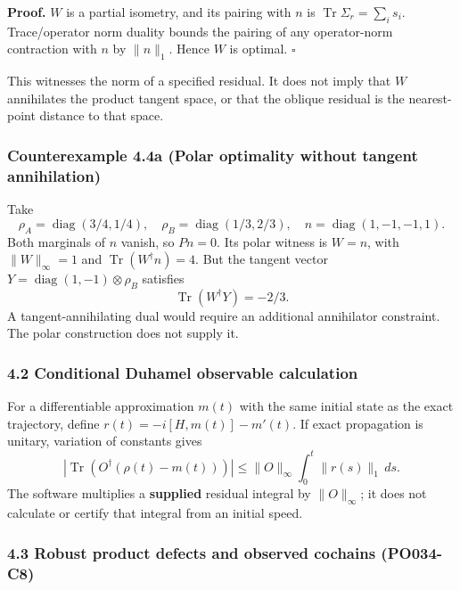 \documentclass[
  11pt,
]{article}
\begin{document}
\textbf{Proof.} \(W\) is a partial isometry, and its pairing with \(n\) is
\(\operatorname{Tr}\Sigma_r=\sum_i s_i\). Trace/operator norm duality
bounds the pairing of any operator-norm contraction with \(n\) by
\(\|n\|_1\). Hence \(W\) is optimal. \(\square\)

This witnesses the norm of a specified residual. It does not imply that
\(W\) annihilates the product tangent space, or that the oblique residual
is the nearest-point distance to that space.

\subsubsection{Counterexample 4.4a (Polar optimality without tangent annihilation)}\label{counterexample-4.4a-polar-optimality-without-tangent-annihilation}

Take
\[
\rho_A=\operatorname{diag}(3/4,1/4),\quad
\rho_B=\operatorname{diag}(1/3,2/3),\quad
n=\operatorname{diag}(1,-1,-1,1).
\]
Both marginals of \(n\) vanish, so \(Pn=0\).
Its polar witness is \(W=n\), with \(\|W\|_\infty=1\) and
\(\operatorname{Tr}(W^\dagger n)=4\).
But the tangent vector
\(Y=\operatorname{diag}(1,-1)\otimes\rho_B\) satisfies
\[
\operatorname{Tr}(W^\dagger Y)=-2/3.
\]
A tangent-annihilating dual would require an additional annihilator
constraint. The polar construction does not supply it.

\subsubsection{4.2 Conditional Duhamel observable calculation}\label{conditional-duhamel-observable-calculation}

For a differentiable approximation \(m(t)\) with the same initial state as
the exact trajectory, define \(r(t)=-i[H,m(t)]-m'(t)\).
If exact propagation is unitary, variation of constants gives
\[
|\operatorname{Tr}(O^\dagger(\rho(t)-m(t)))|
 \le\|O\|_\infty\int_0^t\|r(s)\|_1\,ds.
\]
The software multiplies a \textbf{supplied} residual integral by \(\|O\|_\infty\);
it does not calculate or certify that integral from an initial speed.

\subsubsection{4.3 Robust product defects and observed cochains (PO034-C8)}\label{robust-product-defects-and-observed-cochains-po034-c8}
\end{document}
